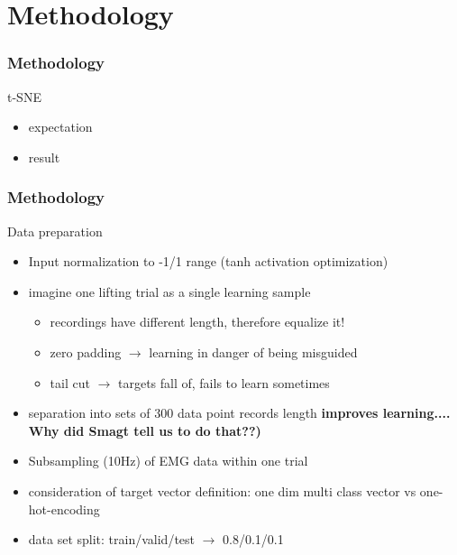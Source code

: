 \documentclass{beamer}
\begin{document}
\section{Methodology}

\begin{frame}
\frametitle{Methodology}
t-SNE
\begin{itemize}
    \item expectation
    \item result
\end{itemize}
\end{frame}


\begin{frame}
\frametitle{Methodology}
Data preparation
\begin{itemize}
    \item Input normalization to -1/1 range (tanh activation optimization)
    \item imagine one lifting trial as a single learning sample
    \begin{itemize}
        \item recordings have different length, therefore equalize it!
        \item zero padding $\rightarrow$ learning in danger of being misguided
        \item tail cut $\rightarrow$ targets fall of, fails to learn sometimes
    \end{itemize}
    \item separation into sets of 300 data point records length \textbf{improves learning.... Why did Smagt tell us to do that??)}
   	\item Subsampling (10Hz) of EMG data within one trial
   	\item consideration of target vector definition: one dim multi class vector vs one-hot-encoding
   	\item data set split: train/valid/test $\rightarrow$ 0.8/0.1/0.1
\end{itemize}
\end{frame}
\end{document}
